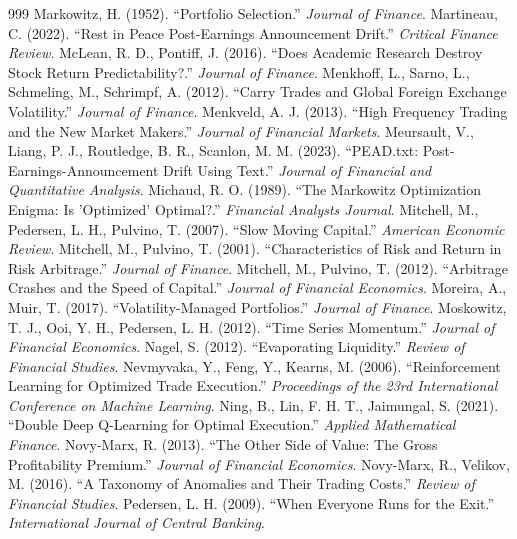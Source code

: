 \begin{thebibliography}{999}
 Markowitz, H. (1952). ``Portfolio Selection.'' \textit{Journal of Finance}.
 Martineau, C. (2022). ``Rest in Peace Post-Earnings Announcement Drift.'' \textit{Critical Finance Review}.
 McLean, R. D., Pontiff, J. (2016). ``Does Academic Research Destroy Stock Return Predictability?.'' \textit{Journal of Finance}.
 Menkhoff, L., Sarno, L., Schmeling, M., Schrimpf, A. (2012). ``Carry Trades and Global Foreign Exchange Volatility.'' \textit{Journal of Finance}.
 Menkveld, A. J. (2013). ``High Frequency Trading and the New Market Makers.'' \textit{Journal of Financial Markets}.
 Meursault, V., Liang, P. J., Routledge, B. R., Scanlon, M. M. (2023). ``PEAD.txt: Post-Earnings-Announcement Drift Using Text.'' \textit{Journal of Financial and Quantitative Analysis}.
 Michaud, R. O. (1989). ``The Markowitz Optimization Enigma: Is 'Optimized' Optimal?.'' \textit{Financial Analysts Journal}.
 Mitchell, M., Pedersen, L. H., Pulvino, T. (2007). ``Slow Moving Capital.'' \textit{American Economic Review}.
 Mitchell, M., Pulvino, T. (2001). ``Characteristics of Risk and Return in Risk Arbitrage.'' \textit{Journal of Finance}.
 Mitchell, M., Pulvino, T. (2012). ``Arbitrage Crashes and the Speed of Capital.'' \textit{Journal of Financial Economics}.
 Moreira, A., Muir, T. (2017). ``Volatility-Managed Portfolios.'' \textit{Journal of Finance}.
 Moskowitz, T. J., Ooi, Y. H., Pedersen, L. H. (2012). ``Time Series Momentum.'' \textit{Journal of Financial Economics}.
 Nagel, S. (2012). ``Evaporating Liquidity.'' \textit{Review of Financial Studies}.
 Nevmyvaka, Y., Feng, Y., Kearns, M. (2006). ``Reinforcement Learning for Optimized Trade Execution.'' \textit{Proceedings of the 23rd International Conference on Machine Learning}.
 Ning, B., Lin, F. H. T., Jaimungal, S. (2021). ``Double Deep Q-Learning for Optimal Execution.'' \textit{Applied Mathematical Finance}.
 Novy-Marx, R. (2013). ``The Other Side of Value: The Gross Profitability Premium.'' \textit{Journal of Financial Economics}.
 Novy-Marx, R., Velikov, M. (2016). ``A Taxonomy of Anomalies and Their Trading Costs.'' \textit{Review of Financial Studies}.
 Pedersen, L. H. (2009). ``When Everyone Runs for the Exit.'' \textit{International Journal of Central Banking}.

\end{thebibliography}
